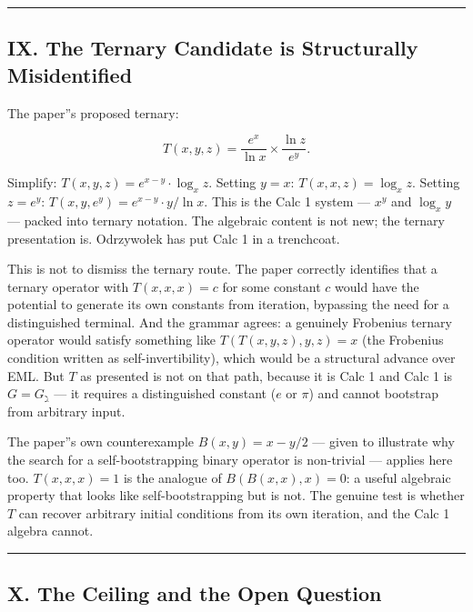 \documentclass[12pt,a4paper]{article}
\begin{document}
\begin{center}
\rule{0.5\textwidth}{0.4pt}
\end{center}

\subsection{IX. The Ternary Candidate is Structurally Misidentified}

The paper''s proposed ternary:


\[T(x,y,z) = \frac{e^x}{\ln x} \times \frac{\ln z}{e^y}.\]


Simplify: $T(x,y,z) = e^{x-y} \cdot \log_x z$. Setting $y = x$:
$T(x,x,z) = \log_x z$. Setting $z = e^y$: $T(x,y,e^y) = e^{x-y} \cdot y/\ln x$.
This is the Calc 1 system --- $x^y$ and $\log_x y$ --- packed into ternary notation.
The algebraic content is not new; the ternary presentation is. Odrzywołek has
put Calc 1 in a trenchcoat.

This is not to dismiss the ternary route. The paper correctly identifies that a
ternary operator with $T(x,x,x) = c$ for some constant $c$ would have the
potential to generate its own constants from iteration, bypassing the need for a
distinguished terminal. And the grammar agrees: a genuinely Frobenius ternary
operator would satisfy something like $T(T(x,y,z), y, z) = x$ (the Frobenius
condition written as self-invertibility), which would be a structural advance
over EML. But $T$ as presented is not on that path, because it is Calc 1 and
Calc 1 is $G = G_{\gimel}$ --- it requires a distinguished constant ($e$ or $\pi$)
and cannot bootstrap from arbitrary input.

The paper''s own counterexample $B(x,y) = x - y/2$ --- given to illustrate why the
search for a self-bootstrapping binary operator is non-trivial --- applies here too.
$T(x,x,x) = 1$ is the analogue of $B(B(x,x),x) = 0$: a useful algebraic property
that looks like self-bootstrapping but is not. The genuine test is whether $T$ can
recover arbitrary initial conditions from its own iteration, and the Calc 1 algebra
cannot.

\begin{center}
\rule{0.5\textwidth}{0.4pt}
\end{center}

\subsection{X. The Ceiling and the Open Question}
\end{document}
